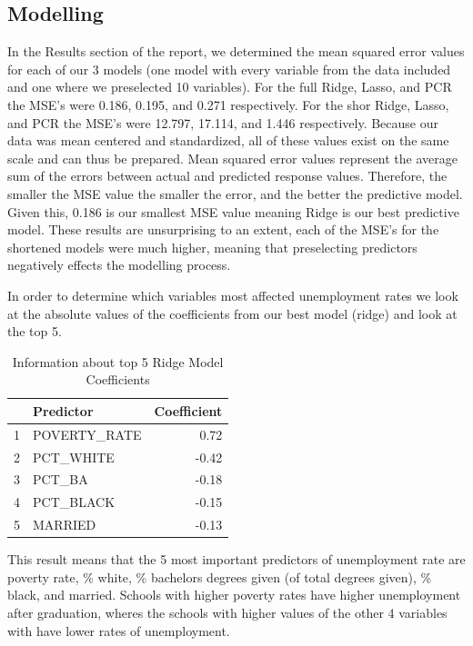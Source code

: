 \documentclass{article}\usepackage[]{graphicx}\usepackage[]{color}
\begin{document}
\subsection{Modelling}
In the Results section of the report, we determined the mean squared error values for each of our 3 models (one model with every variable from the data included and one where we preselected 10 variables).  For the full Ridge, Lasso, and PCR the MSE's were 0.186, 0.195, and 0.271 respectively. For the shor Ridge, Lasso, and PCR the MSE's were 12.797, 17.114, and 1.446 respectively. Because our data was mean centered and standardized, all of these values exist on the same scale and can thus be prepared.  Mean squared error values represent the average sum of the errors between actual and predicted response values. Therefore, the smaller the MSE value the smaller the error, and the better the predictive model.  Given this, 0.186 is our smallest MSE value meaning Ridge is our best predictive model. These results are unsurprising to an extent, each of the MSE's for the shortened models were much higher, meaning that preselecting predictors negatively effects the modelling process.  

In order to determine which variables most affected unemployment rates we look at the absolute values of the coefficients from our best model (ridge) and look at the top 5. 


\begin{table}[ht]
\centering
\begin{tabular}{rlr}
  \hline
 & Predictor & Coefficient \\ 
  \hline
1 & POVERTY\_RATE & 0.72 \\ 
  2 & PCT\_WHITE & -0.42 \\ 
  3 & PCT\_BA & -0.18 \\ 
  4 & PCT\_BLACK & -0.15 \\ 
  5 & MARRIED & -0.13 \\ 
   \hline
\end{tabular}
\caption{Information about top 5  Ridge Model Coefficients} 
\end{table}


This result means that the 5 most important predictors of unemployment rate are poverty rate, \% white, \% bachelors degrees given (of total degrees given), \% black, and married.  Schools with higher poverty rates have higher unemployment after graduation, wheres the schools with higher values of the other 4 variables with have lower rates of unemployment.
\end{document}
